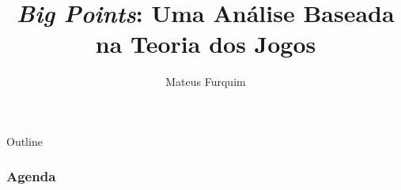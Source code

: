 \documentclass[12pt]{beamer}
\title{\emph{Big Points}: Uma Análise Baseada na Teoria dos Jogos}
\author{Mateus Furquim}
\institute{Engenharia de Software\\ Universidade de Brasília}
\begin{document}
\frame{\titlepage \vspace{-0.5cm}
}
\begin{frame}[allowframebreaks]{Outline}
	\frametitle{Agenda}
	\tableofcontents%
\end{frame}




\end{document}
